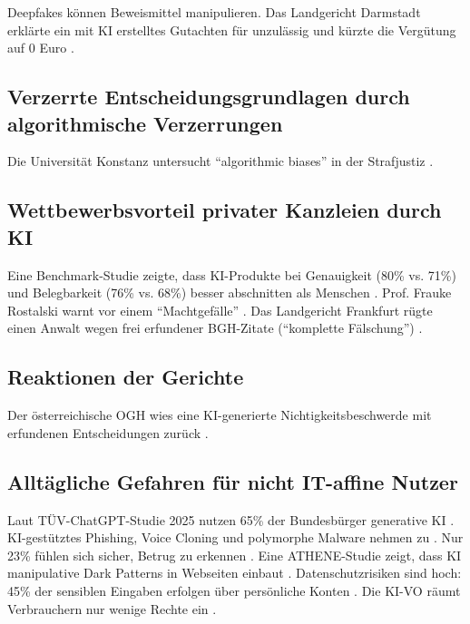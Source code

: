 \documentclass[12pt,a4paper]{article}
\begin{document}
	Deepfakes können Beweismittel manipulieren. Das Landgericht Darmstadt erklärte ein mit KI erstelltes Gutachten für unzulässig und kürzte die Vergütung auf 0 Euro \cite{LG Darmstadt2025}.
	
	\subsection{Verzerrte Entscheidungsgrundlagen durch algorithmische Verzerrungen}
	
	Die Universität Konstanz untersucht \enquote{algorithmic biases} in der Strafjustiz \cite{Uni Konstanz2025}.
	
	\subsection{Wettbewerbsvorteil privater Kanzleien durch KI}
	
	Eine Benchmark-Studie zeigte, dass KI-Produkte bei Genauigkeit (80\% vs. 71\%) und Belegbarkeit (76\% vs. 68\%) besser abschnitten als Menschen \cite{ValAI2025}. Prof. Frauke Rostalski warnt vor einem \enquote{Machtgefälle} \cite{Rostalski2024}. Das Landgericht Frankfurt rügte einen Anwalt wegen frei erfundener BGH-Zitate (\enquote{komplette Fälschung}) \cite{LG Frankfurt2025}.
	
	\subsection{Reaktionen der Gerichte}
	
	Der österreichische OGH wies eine KI-generierte Nichtigkeitsbeschwerde mit erfundenen Entscheidungen zurück \cite{OGH2025}.
	
	\subsection{Alltägliche Gefahren für nicht IT-affine Nutzer}
	
	Laut TÜV-ChatGPT-Studie 2025 nutzen 65\% der Bundesbürger generative KI \cite{TUEV2025}. KI-gestütztes Phishing, Voice Cloning und polymorphe Malware nehmen zu \cite{SecurityInsider2025a, Watchguard2025, ConnectProfessional2025}. Nur 23\% fühlen sich sicher, Betrug zu erkennen \cite{SecurityInsider2025b}. Eine ATHENE-Studie zeigt, dass KI manipulative Dark Patterns in Webseiten einbaut \cite{ATHENE2025}. Datenschutzrisiken sind hoch: 45\% der sensiblen Eingaben erfolgen über persönliche Konten \cite{Itwelt2025}. Die KI-VO räumt Verbrauchern nur wenige Rechte ein \cite{VZBV2025}.
	
\end{document}
